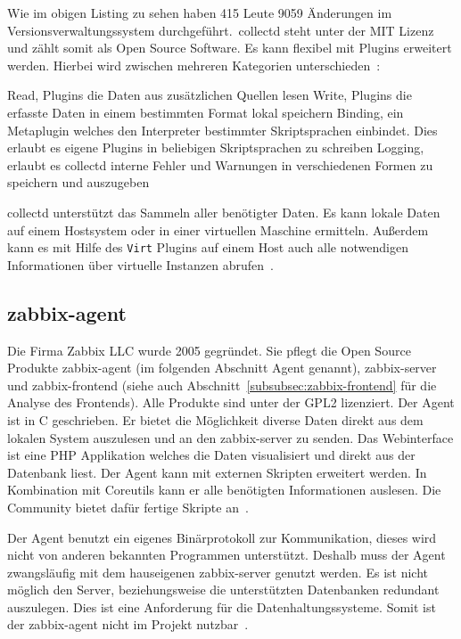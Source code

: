 

Wie im obigen Listing zu sehen haben 415 Leute 9059 Änderungen im
Versionsverwaltungssystem durchgeführt.\ collectd steht unter der MIT Lizenz
und zählt somit als Open Source Software. Es kann flexibel mit Plugins
erweitert werden. Hierbei wird zwischen mehreren Kategorien
unterschieden~\cite{collectd_plugins}:

\begin{outline}
  \1 Read, Plugins die Daten aus zusätzlichen Quellen lesen
  \1 Write, Plugins die erfasste Daten in einem bestimmten Format lokal
  speichern
  \1 Binding, ein Metaplugin welches den Interpreter bestimmter Skriptsprachen
  einbindet. Dies erlaubt es eigene Plugins in beliebigen Skriptsprachen zu
  schreiben
  \1 Logging, erlaubt es collectd interne Fehler und Warnungen in verschiedenen
  Formen zu speichern und auszugeben
\end{outline}

collectd unterstützt das Sammeln aller benötigter Daten. Es kann lokale Daten
auf einem Hostsystem oder in einer virtuellen Maschine ermitteln. Außerdem kann
es mit Hilfe des \texttt{Virt} Plugins auf einem Host auch alle notwendigen
Informationen über virtuelle Instanzen abrufen~\cite{collectd_virt_plugins}.
\tm%

\subsection{zabbix-agent}
Die Firma Zabbix LLC wurde 2005 gegründet. Sie pflegt die Open Source
Produkte zabbix-agent (im folgenden Abschnitt Agent genannt), zabbix-server und
zabbix-frontend (siehe auch Abschnitt~\ref{subsubsec:zabbix-frontend} für die
Analyse des Frontends). Alle Produkte sind unter der GPL2 lizenziert. Der Agent
ist in C geschrieben. Er bietet die Möglichkeit diverse Daten direkt aus dem
lokalen System auszulesen und an den zabbix-server zu senden. Das Webinterface
ist eine PHP Applikation welches die Daten visualisiert und direkt aus der
Datenbank liest. Der Agent kann mit externen Skripten erweitert werden. In
Kombination mit Coreutils kann er alle benötigten Informationen auslesen. Die
Community bietet dafür fertige Skripte an~\cite{zabbix_virt_plugins}.

Der Agent benutzt ein eigenes Binärprotokoll zur Kommunikation, dieses wird
nicht von anderen bekannten Programmen unterstützt. Deshalb muss der Agent
zwangsläufig mit dem hauseigenen zabbix-server genutzt werden. Es ist nicht
möglich den Server, beziehungsweise die unterstützten Datenbanken redundant
auszulegen. Dies ist eine Anforderung für die Datenhaltungssysteme. Somit
ist der zabbix-agent nicht im Projekt nutzbar~\cite{zabbix_architecture}.
\tm%

